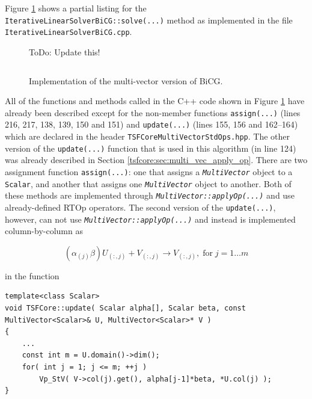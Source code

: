 \documentclass[10pt,fleqn]{article}
\begin{document}
Figure \ref{tsfcore:fig:BiCG_code} shows a partial listing for the
\texttt{Iterative\-Linear\-Solver\-BiCG\-::solve(...)} method as
implemented in the file \texttt{IterativeLinearSolverBiCG.cpp}.
%
{\bsinglespace
\begin{figure}
\begin{minipage}{\textwidth}
ToDo: Update this!
{\tiny\begin{verbatim}
\end{verbatim}}
\end{minipage}
\caption{
\label{tsfcore:fig:BiCG_code}
Implementation of the multi-vector version of BiCG.
}
\end{figure}
\esinglespace}
%
All of the functions and methods called in the C++ code shown in
Figure \ref{tsfcore:fig:BiCG_code} have already been described except for
the non-member functions \texttt{assign(...)} (lines 216, 217, 138,
139, 150 and 151) and \texttt{update(...)} (lines 155, 156 and
162--164) which are declared in the header
\texttt{TSFCoreMultiVectorStdOps.hpp}.  The other version of the \texttt{update(...)}
function that is used in this algorithm (in line 124) was already
described in Section \ref{tsfcore:sec:multi_vec_apply_op}.  There are two
assignment function \texttt{assign(...)}: one that assigns a
\texttt{\textit{MultiVector}} object to a \texttt{Scalar}, and another
that assigns one \texttt{\textit{MultiVector}} object to another.
Both of these methods are implemented through
\texttt{\textit{MultiVector\-::applyOp(...)}} and use already-defined
RTOp operators.  The second version of the \texttt{update(...)}, however,
can not use \texttt{\textit{MultiVector\-::applyOp(...)}} and instead is
implemented column-by-column as

\[
(\alpha_{(j)} \beta) U_{(:,j)} + V_{(:,j)} \rightarrow V_{(:,j)}, \; \mbox{for} \; j = 1 \ldots m
\]

in the function

{\scriptsize\begin{verbatim}
template<class Scalar>
void TSFCore::update( Scalar alpha[], Scalar beta, const MultiVector<Scalar>& U, MultiVector<Scalar>* V )
{
    ...
    const int m = U.domain()->dim();
    for( int j = 1; j <= m; ++j )
        Vp_StV( V->col(j).get(), alpha[j-1]*beta, *U.col(j) );
}
\end{verbatim}}
\end{document}
